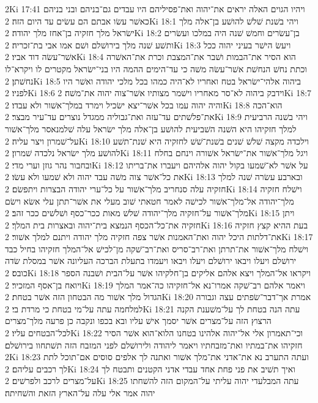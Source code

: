 2Ki 17:41  ויהיו הגוים האלה יראים את־יהוה ואת־פסיליהם היו עבדים גם־בניהם ובני בניהם כאשׁר עשׂו אבתם הם עשׂים עד היום הזה׃
2Ki 18:1  ויהי בשׁנת שׁלשׁ להושׁע בן־אלה מלך ישׂראל מלך חזקיה בן־אחז מלך יהודה׃
2Ki 18:2  בן־עשׂרים וחמשׁ שׁנה היה במלכו ועשׂרים ותשׁע שׁנה מלך בירושׁלם ושׁם אמו אבי בת־זכריה׃
2Ki 18:3  ויעשׂ הישׁר בעיני יהוה ככל אשׁר־עשׂה דוד אביו׃
2Ki 18:4  הוא הסיר את־הבמות ושׁבר את־המצבת וכרת את־האשׁרה וכתת נחשׁ הנחשׁת אשׁר־עשׂה משׁה כי עד־הימים ההמה היו בני־ישׂראל מקטרים לו ויקרא־לו נחשׁתן׃
2Ki 18:5  ביהוה אלהי־ישׂראל בטח ואחריו לא־היה כמהו בכל מלכי יהודה ואשׁר היו לפניו׃
2Ki 18:6  וידבק ביהוה לא־סר מאחריו וישׁמר מצותיו אשׁר־צוה יהוה את־משׁה׃
2Ki 18:7  והיה יהוה עמו בכל אשׁר־יצא ישׂכיל וימרד במלך־אשׁור ולא עבדו׃
2Ki 18:8  הוא־הכה את־פלשׁתים עד־עזה ואת־גבוליה ממגדל נוצרים עד־עיר מבצר׃
2Ki 18:9  ויהי בשׁנה הרביעית למלך חזקיהו היא השׁנה השׁביעית להושׁע בן־אלה מלך ישׂראל עלה שׁלמנאסר מלך־אשׁור על־שׁמרון ויצר עליה׃
2Ki 18:10  וילכדה מקצה שׁלשׁ שׁנים בשׁנת־שׁשׁ לחזקיה היא שׁנת־תשׁע להושׁע מלך ישׂראל נלכדה שׁמרון׃
2Ki 18:11  ויגל מלך־אשׁור את־ישׂראל אשׁורה וינחם בחלח ובחבור נהר גוזן וערי מדי׃
2Ki 18:12  על אשׁר לא־שׁמעו בקול יהוה אלהיהם ויעברו את־בריתו את כל־אשׁר צוה משׁה עבד יהוה ולא שׁמעו ולא עשׂו׃
2Ki 18:13  ובארבע עשׂרה שׁנה למלך חזקיה עלה סנחריב מלך־אשׁור על כל־ערי יהודה הבצרות ויתפשׂם׃
2Ki 18:14  וישׁלח חזקיה מלך־יהודה אל־מלך־אשׁור לכישׁה לאמר חטאתי שׁוב מעלי את אשׁר־תתן עלי אשׂא וישׂם מלך־אשׁור על־חזקיה מלך־יהודה שׁלשׁ מאות ככר־כסף ושׁלשׁים ככר זהב׃
2Ki 18:15  ויתן חזקיה את־כל־הכסף הנמצא בית־יהוה ובאצרות בית המלך׃
2Ki 18:16  בעת ההיא קצץ חזקיה את־דלתות היכל יהוה ואת־האמנות אשׁר צפה חזקיה מלך יהודה ויתנם למלך אשׁור׃
2Ki 18:17  וישׁלח מלך־אשׁור את־תרתן ואת־רב־סריס ואת־רב־שׁקה מן־לכישׁ אל־המלך חזקיהו בחיל כבד ירושׁלם ויעלו ויבאו ירושׁלם ויעלו ויבאו ויעמדו בתעלת הברכה העליונה אשׁר במסלת שׂדה כובס׃
2Ki 18:18  ויקראו אל־המלך ויצא אלהם אליקים בן־חלקיהו אשׁר על־הבית ושׁבנה הספר ויואח בן־אסף המזכיר׃
2Ki 18:19  ויאמר אלהם רב־שׁקה אמרו־נא אל־חזקיהו כה־אמר המלך הגדול מלך אשׁור מה הבטחון הזה אשׁר בטחת׃
2Ki 18:20  אמרת אך־דבר־שׂפתים עצה וגבורה למלחמה עתה על־מי בטחת כי מרדת בי׃
2Ki 18:21  עתה הנה בטחת לך על־משׁענת הקנה הרצוץ הזה על־מצרים אשׁר יסמך אישׁ עליו ובא בכפו ונקבה כן פרעה מלך־מצרים לכל־הבטחים עליו׃
2Ki 18:22  וכי־תאמרון אלי אל־יהוה אלהינו בטחנו הלוא־הוא אשׁר הסיר חזקיהו את־במתיו ואת־מזבחתיו ויאמר ליהודה ולירושׁלם לפני המזבח הזה תשׁתחוו בירושׁלם׃
2Ki 18:23  ועתה התערב נא את־אדני את־מלך אשׁור ואתנה לך אלפים סוסים אם־תוכל לתת לך רכבים עליהם׃
2Ki 18:24  ואיך תשׁיב את פני פחת אחד עבדי אדני הקטנים ותבטח לך על־מצרים לרכב ולפרשׁים׃
2Ki 18:25  עתה המבלעדי יהוה עליתי על־המקום הזה להשׁחתו יהוה אמר אלי עלה על־הארץ הזאת והשׁחיתה׃
